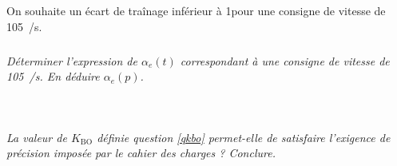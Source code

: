 \documentclass[10pt,fleqn]{article} %
\begin{document}
\begin{multicols}{2}
On souhaite un écart de traînage inférieur à 1\degres pour une consigne de vitesse de \SI{105}{\degres/s}. 

\subparagraph{}\textit{Déterminer l’expression de $\alpha_e(t)$ correspondant à une consigne de vitesse
de \SI{105}{\degres/s}. En déduire $\alpha_e(p)$.}
\ifprof
\begin{corrige}~\\
\end{corrige}
\else
\fi

\subparagraph{}\textit{La valeur de $K_{\text{BO}}$ définie question \ref{qkbo} permet-elle de satisfaire l’exigence
de précision imposée par le cahier des charges ? Conclure. }
\ifprof
\begin{corrige}~\\
\end{corrige}
\else
\fi


\end{multicols}
\end{document}

